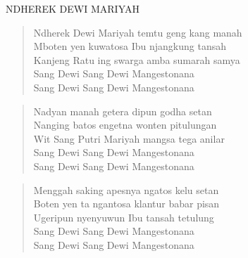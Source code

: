 \itshape{
\begin{center}
NDHEREK DEWI MARIYAH\end{center} 
\begin{verse}
Ndherek Dewi Mariyah temtu geng kang manah \\
Mboten yen kuwatosa Ibu njangkung tansah \\
Kanjeng Ratu ing swarga amba sumarah samya \\
Sang Dewi Sang Dewi Mangestonana \\
Sang Dewi Sang Dewi Mangestonana 
\end{verse}
\begin{verse}
Nadyan manah getera dipun godha setan\\ 
Nanging batos engetna wonten pitulungan\\ 
Wit Sang Putri Mariyah mangsa tega anilar\\ 
Sang Dewi Sang Dewi Mangestonana \\
Sang Dewi Sang Dewi Mangestonana 
\end{verse}
\begin{verse}
Menggah saking apesnya ngatos kelu setan \\
Boten yen ta ngantosa klantur babar pisan \\
Ugeripun nyenyuwun Ibu tansah tetulung \\
Sang Dewi Sang Dewi Mangestonana \\
Sang Dewi Sang Dewi Mangestonana 
\end{verse}
}